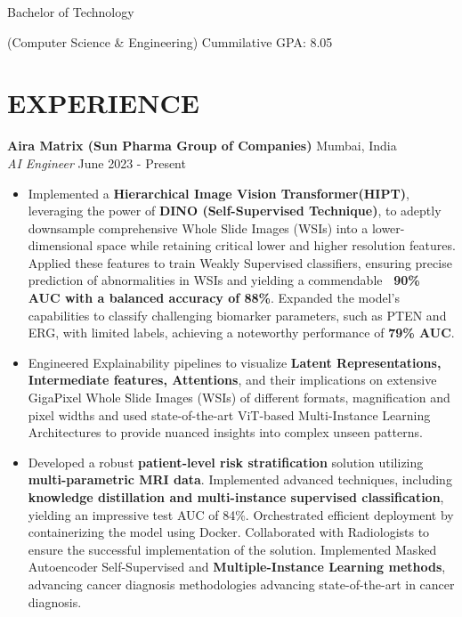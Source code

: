 \documentclass[a4paper,10pt]{extarticle}
\begin{document}
Bachelor of Technology  \small{(Computer Science \& Engineering) \hfill Cummilative GPA: 8.05\\ 

\section*{EXPERIENCE}
\noindent
\textbf{Aira Matrix \small{(Sun Pharma Group of Companies)}} \hfill Mumbai, India\\ %
\textit{AI Engineer} \hfill June 2023 - Present %
\begin{itemize}
    \item Implemented a \textbf{Hierarchical Image Vision Transformer(HIPT)}, leveraging the power of \textbf{DINO (Self-Supervised Technique)}, to adeptly downsample comprehensive Whole Slide Images (WSIs) into a lower-dimensional space while retaining critical lower and higher resolution features. Applied these features to train Weakly Supervised classifiers, ensuring precise prediction of abnormalities in WSIs and yielding a commendable \textbf{~90\% AUC with a balanced accuracy of 88\%}. Expanded the model's capabilities to classify challenging biomarker parameters, such as PTEN and ERG, with limited labels, achieving a noteworthy performance of \textbf{79\% AUC}.
    
    \vspace{1.2mm}\item Engineered Explainability pipelines to visualize \textbf{Latent Representations, Intermediate features, Attentions}, and their implications on extensive GigaPixel Whole Slide Images (WSIs) of different formats, magnification and pixel widths and used state-of-the-art ViT-based Multi-Instance Learning Architectures to provide nuanced insights into complex unseen patterns.
    
    \vspace{1.2mm}\item Developed a robust \textbf{patient-level risk stratification} solution utilizing \textbf{multi-parametric MRI data}. Implemented advanced techniques, including \textbf{knowledge distillation and multi-instance supervised classification}, yielding an impressive test AUC of 84\%. Orchestrated efficient deployment by containerizing the model using Docker. Collaborated with Radiologists to ensure the successful implementation of the solution. Implemented Masked Autoencoder Self-Supervised and \textbf{Multiple-Instance Learning methods}, advancing cancer diagnosis methodologies advancing state-of-the-art in cancer diagnosis.
    

\end{itemize}}
\end{document}
